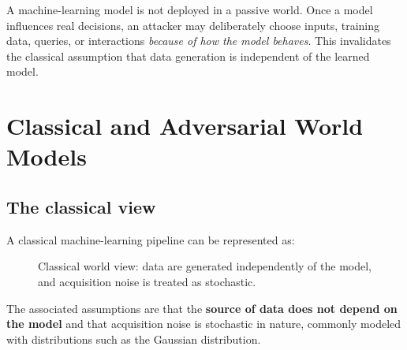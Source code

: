 \documentclass[11pt,a4paper]{report}
\begin{document}
\begin{keybox}
A machine-learning model is not deployed in a passive world. Once a model influences real decisions, an attacker may deliberately choose inputs, training data, queries, or interactions \emph{because of how the model behaves}. This invalidates the classical assumption that data generation is independent of the learned model.
\end{keybox}

\section{Classical and Adversarial World Models}

\subsection{The classical view}

A classical machine-learning pipeline can be represented as:

\begin{figure}[H]
\centering
{}
\caption{Classical world view: data are generated independently of the model, and acquisition noise is treated as stochastic.}
\label{fig:classical-world}
\end{figure}

The associated assumptions are that the \textbf{source of data does not depend on the model} and that acquisition noise is stochastic in nature, commonly modeled with distributions such as the Gaussian distribution.
\end{document}
